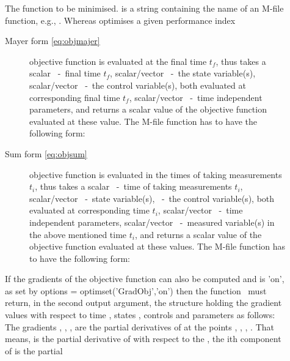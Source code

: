 \begin{description}
\item[] The function to be minimised. 
  is a string containing the name of an M-file function, e.g.,
  . Whereas  optimises a given performance
  index 
  \begin{description}
  \item[Mayer form \eqref{eq:objmajer}] objective function is
    evaluated at the final time $t_{f}$, thus  takes a
    scalar ~-~final time $t_{f}$, scalar/vector
    ~-~the state variable(s), scalar/vector ~-~the
    control variable(s), both evaluated at corresponding  final time
    $t_{f}$, scalar/vector ~-~time independent parameters,
    and returns a scalar value  of the objective function
    evaluated at these value. The M-file function has to have the
    following form: 
    {\small } 
  \item[Sum form \eqref{eq:objsum}] objective function is evaluated in
    the times of taking measurements $t_{i}$, thus  takes
    a scalar ~-~time of taking measurements $t_{i}$,
    scalar/vector ~-~state variable(s), ~-~the
    control variable(s), both evaluated at corresponding time $t_{i}$,
    scalar/vector ~-~time independent parameters,
    scalar/vector ~-~measured variable(s) in the above
    mentioned time $t_{i}$, and returns a scalar value  of
    the objective function evaluated at these values. The M-file
    function has to have the following form:   
    {\small } 
   \end{description}
   If the gradients of the objective function can also be computed
   and  is 'on', as set by options =
   optimset('GradObj','on') then the function~ must return,
   in the second output argument, the structure  holding the
   gradient values with respect to time , states ,
   controls  and parameters  as follows:
   {\small }
   The gradients , , ,
    are the partial derivatives of  at the
   points , , , . That means,
    is the partial derivative of  with respect
   to the , the ith component of  is the partial

\end{description}

